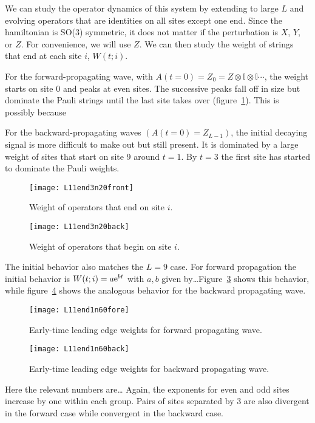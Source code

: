 We can study the operator dynamics of this system by extending to large $L$ and evolving operators that are identities on all sites except one end. Since the hamiltonian is SO(3) symmetric, it does not matter if the perturbation is $X$, $Y$, or $Z$. For convenience, we will use $Z$. We can then study the weight of strings that end at each site $i$, $W(t; i)$.

For the forward-propagating wave, with $A(t=0) = Z_0 = Z\otimes \mathbb{I} \otimes \mathbb{I} \cdots$, the weight starts on site 0 and peaks at even sites. The successive peaks fall off in size but dominate the Pauli strings until the last site takes over (figure~\ref{fig:L11end3n20front}). This is possibly because 

For the backward-propagating waves $(A(t=0)=Z_{L-1})$, the initial decaying signal is more difficult to make out but still present. It is dominated by a large weight of sites that start on site 9 around $t=1$. By $t = 3$ the first site has started to dominate the Pauli weights.

\begin{figure}
	\centering
	\texttt{[image: L11end3n20front]}
	\caption{Weight of operators that end on site $i$.}
	\label{fig:L11end3n20front}
\end{figure}
\begin{figure}
	\centering
	\texttt{[image: L11end3n20back]}
	\caption{Weight of operators that begin on site $i$.}
	\label{fig:L11end3n20back}
\end{figure}

The initial behavior also matches the $L=9$ case. For forward propagation the initial behavior is $W(t;i) = a\text{e}^{bt}$ with $a,b$ given by\dots Figure~\ref{fig:L11end1n60fore} shows this behavior, while figure~\ref{fig:L11end1n60back} shows the analogous behavior for the backward propagating wave. 

\begin{figure}
	\centering
	\texttt{[image: L11end1n60fore]}
	\caption{Early-time leading edge weights for forward propagating wave.}
	\label{fig:L11end1n60fore}
\end{figure}
\begin{figure}
	\centering
	\texttt{[image: L11end1n60back]}
	\caption{Early-time leading edge weights for backward propagating wave.}
	\label{fig:L11end1n60back}
\end{figure}

Here the relevant numbers are\dots
Again, the exponents for even and odd sites increase by one within each group. Pairs of sites separated by 3 are also divergent in the forward case while convergent in the backward case.